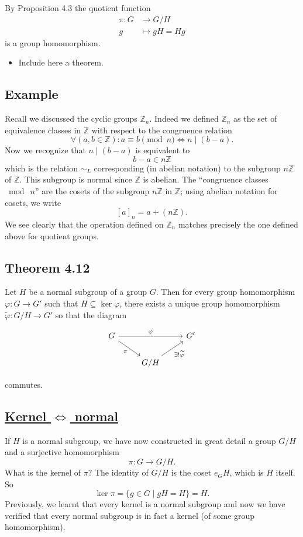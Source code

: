 \vspace{1em}

\noindent By Proposition 4.3 the quotient function
\begin{align*}
\pi : G &\longrightarrow G/H \\
g &\longmapsto gH = Hg
\end{align*}
is a group homomorphism.

\begin{itemize}
    \item \color{red} Include here a theorem.
\end{itemize}

\subsection*{Example}
Recall we discussed the cyclic groups $\mathbb{Z}_n$. Indeed we defined $\mathbb{Z}_n$ as the set of equivalence classes in $\mathbb{Z}$ with respect to the congruence relation
$$\forall(a, b \in \mathbb{Z}) : a \equiv b \pmod n \iff n \mid (b-a).$$
Now we recognize that $n \mid (b-a)$ is equivalent to
$$b-a \in n\mathbb{Z}$$
which is the relation $\sim_L$ corresponding (in abelian notation) to the subgroup $n\mathbb{Z}$ of $\mathbb{Z}$. This subgroup is normal since $\mathbb{Z}$ is abelian. The ``congruence classes $\bmod\ n$'' are the cosets of the subgroup $n\mathbb{Z}$ in $\mathbb{Z}$; using abelian notation for cosets, we write
$$[a]_n = a + (n\mathbb{Z}).$$
We see clearly that the operation defined on $\mathbb{Z}_n$ matches precisely the one defined above for quotient groups.

\subsection*{\color{red}Theorem 4.12}
Let $H$ be a normal subgroup of a group $G$. Then for every group homomorphism $\varphi : G \longrightarrow G'$ such that $H \subseteq \ker\varphi$, there exists a unique group homomorphism $\widetilde{\varphi} : G/H \longrightarrow G'$ so that the diagram

\[
\begin{tikzcd}
G \arrow[rr, "\varphi"] \arrow[rd, "\pi"'] &  & G' \\
 & G/H \arrow[ru, "\exists ! \widetilde{\varphi}"'] &
\end{tikzcd}
\]

\noindent commutes.

\subsection*{\underline{Kernel $\iff$ normal}}
If $H$ is a normal subgroup, we have now constructed in great detail a group $G/H$ and a surjective homomorphism
$$\pi : G \longrightarrow G/H.$$
\color{blue}What is the kernel of $\pi$? \color{black}The identity of $G/H$ is the coset $e_G H$, which is $H$ itself. So
$$\ker\pi = \{g \in G \mid gH = H\} = H.$$
Previously, we learnt that every kernel is a normal subgroup and now we have verified that every normal subgroup is in fact a kernel (of some group homomorphism).

